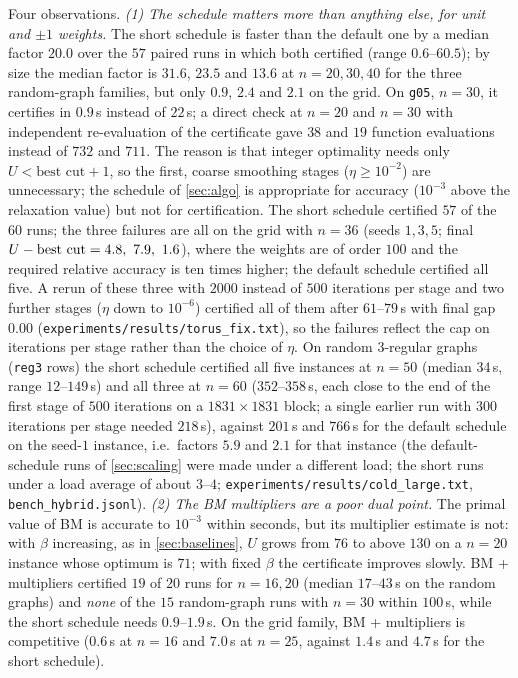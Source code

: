 \documentclass[a4paper,11pt]{article}
\theoremstyle{plain}
\theoremstyle{definition}
\theoremstyle{remark}
\begin{document}
Four observations. \emph{(1) The schedule matters more than anything else, for unit and $\pm1$ weights.} The short schedule is faster than the default one by a median factor $20.0$ over the $57$ paired runs in which both certified (range $0.6$--$60.5$); by size the median factor is $31.6$, $23.5$ and $13.6$ at $n=20,30,40$ for the three random-graph families, but only $0.9$, $2.4$ and $2.1$ on the grid. On \texttt{g05}, $n=30$, it certifies in $0.9$\,s instead of $22$\,s; a direct check at $n=20$ and $n=30$ with independent re-evaluation of the certificate gave $38$ and $19$ function evaluations instead of $732$ and $711$. The reason is that integer optimality needs only $U<\text{best cut}+1$, so the first, coarse smoothing stages ($\eta\ge10^{-2}$) are unnecessary; the schedule of \cref{sec:algo} is appropriate for accuracy ($10^{-3}$ above the relaxation value) but not for certification. The short schedule certified $57$ of the $60$ runs; the three failures are all on the grid with $n=36$ (seeds $1,3,5$; final $U-{\rm best\ cut}=4.8,\ 7.9,\ 1.6$), where the weights are of order $100$ and the required relative accuracy is ten times higher; the default schedule certified all five. A rerun of these three with $2000$ instead of $500$ iterations per stage and two further stages ($\eta$ down to $10^{-6}$) certified all of them after $61$--$79$\,s with final gap $0.00$ (\texttt{experiments/results/torus\_fix.txt}), so the failures reflect the cap on iterations per stage rather than the choice of $\eta$. On random $3$-regular graphs (\texttt{reg3} rows) the short schedule certified all five instances at $n=50$ (median $34$\,s, range $12$--$149$\,s) and all three at $n=60$ ($352$--$358$\,s, each close to the end of the first stage of $500$ iterations on a $1831\times1831$ block; a single earlier run with $300$ iterations per stage needed $218$\,s), against $201$\,s and $766$\,s for the default schedule on the seed-$1$ instance, i.e.\ factors $5.9$ and $2.1$ for that instance (the default-schedule runs of \cref{sec:scaling} were made under a different load; the short runs under a load average of about $3$--$4$; \texttt{experiments/results/cold\_large.txt}, \texttt{bench\_hybrid.jsonl}).
\emph{(2) The BM multipliers are a poor dual point.} The primal value of BM is accurate to $10^{-3}$ within seconds, but its multiplier estimate is not: with $\beta$ increasing, as in \cref{sec:baselines}, $U$ grows from $76$ to above $130$ on a $n=20$ instance whose optimum is $71$; with fixed $\beta$ the certificate improves slowly. BM + multipliers certified $19$ of $20$ runs for $n=16,20$ (median $17$--$43$\,s on the random graphs) and \emph{none} of the $15$ random-graph runs with $n=30$ within $100$\,s, while the short schedule needs $0.9$--$1.9$\,s. On the grid family, BM + multipliers is competitive ($0.6$\,s at $n=16$ and $7.0$\,s at $n=25$, against $1.4$\,s and $4.7$\,s for the short schedule).
\end{document}
